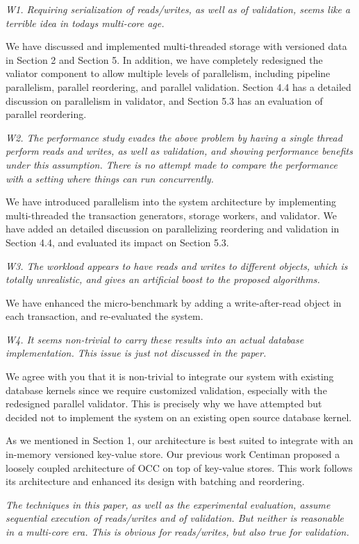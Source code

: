 \documentclass{article}
\begin{document}
\emph{W1. Requiring serialization of reads/writes, as well as of validation, seems like a terrible idea in todays multi-core age. }

We have discussed and implemented multi-threaded storage with versioned data in Section 2 and Section 5. In addition, we have completely redesigned the valiator component to allow multiple levels of parallelism, including pipeline parallelism, parallel reordering, and parallel validation. Section 4.4 has a detailed discussion on parallelism in validator, and Section 5.3 has an evaluation of parallel reordering.

\emph{W2. The performance study evades the above problem by having a single thread perform reads and writes, as well as validation, and showing performance benefits under this assumption. There is no attempt made to compare the performance with a setting where things can run concurrently. }

We have introduced parallelism into the system architecture by implementing multi-threaded the transaction generators, storage workers, and validator. We have added an detailed discussion on parallelizing reordering and validation in Section 4.4, and evaluated its impact on Section 5.3.

\emph{W3. The workload appears to have reads and writes to different objects, which is totally unrealistic, and gives an artificial boost to the proposed algorithms.}

We have enhanced the micro-benchmark by adding a write-after-read object in each transaction, and re-evaluated the system.

\emph{W4. It seems non-trivial to carry these results into an actual database implementation. This issue is just not discussed in the paper.}

We agree with you that it is non-trivial to integrate our system with existing database kernels since we require customized validation, especially with the redesigned parallel validator. This is precisely why we have attempted but decided not to implement the system on an existing open source database kernel.

As we mentioned in Section 1, our architecture is best suited to integrate with an in-memory versioned key-value store. Our previous work Centiman proposed a loosely coupled architecture of OCC on top of key-value stores. This work follows its architecture and enhanced its design with batching and reordering.

\emph{The techniques in this paper, as well as the experimental evaluation, assume sequential execution of reads/writes and of validation. But neither is reasonable in a multi-core era. This is obvious for reads/writes, but also true for validation. 
}
\end{document}
